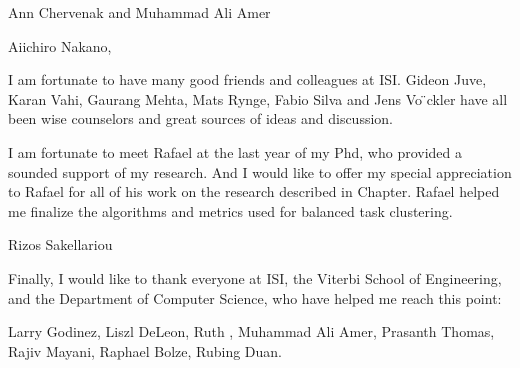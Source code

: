 

Ann Chervenak and Muhammad Ali Amer

Aiichiro Nakano, 

I am fortunate to have many good friends and colleagues at ISI. Gideon Juve, Karan Vahi, Gaurang Mehta, Mats Rynge, Fabio Silva and Jens Vo ̈ckler have all been wise counselors and great sources of ideas and discussion.

I am fortunate to meet Rafael at the last year of my Phd, who provided a sounded support of my research. And I would like to offer my special appreciation to Rafael for all of his work on the research described in Chapter. Rafael helped me finalize the algorithms and metrics used for balanced task clustering. 

Rizos Sakellariou 

Finally, I would like to thank everyone at ISI, the Viterbi School of Engineering, and the Department of Computer Science, who have helped me reach this point: 

Larry Godinez, Liszl DeLeon, Ruth , Muhammad Ali Amer, Prasanth Thomas, Rajiv Mayani, Raphael Bolze, Rubing Duan. 
